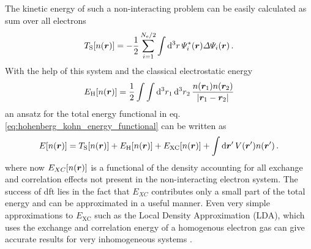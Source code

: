 \documentclass[main.tex]{subfiles}
\begin{document}
The kinetic energy of such a non-interacting problem can be easily calculated as sum over all electrons
\begin{equation}
    T_{\mathrm{S}} [n(\vb*{r})] = - \frac{1}{2} \sum_{i=1}^{N_{\mathrm{e}} / 2} \int \dd[3]{r} \Psi_i^* (\vb*{r}) \Delta \Psi_i (\vb*{r})\,.
\end{equation}
With the help of this system and the classical electrostatic energy 
\begin{equation}
    E_{\mathrm{H}} [n(\vb*{r})] = \frac{1}{2} \int \int \dd[3]{r_1} \dd[3]{r_2} \frac{n(\vb*{r}_1) n(\vb*{r}_2)}{\vert \vb*{r}_1 - \vb*{r}_2 \vert}
\end{equation}
an ansatz for the total energy functional in eq. \ref{eq:hohenberg_kohn_energy_functional} can be written as
\begin{equation}
    E[n(\vb*{r})] = T_{\mathrm{S}} [n(\vb*{r})] + E_{\mathrm{H}} [n(\vb*{r})] + E_{\mathrm{XC}} [n(\vb*{r})] + \int \dd{\vb*{r}^{\prime}} V(\vb*{r}^{\prime}) n (\vb*{r}^{\prime})\,.
\end{equation}
where now \(E_{XC} [n(\vb*{r})]\) is a functional of the density accounting for all exchange and correlation effects not present in the non-interacting electron system.
The success of \acrshort{dft} lies in the fact that \(E_{XC}\) contributes only a small part of the total energy and can be approximated in a useful manner. 
Even very simple approximations to \(E_{\mathrm{XC}}\) such as the Local Density Approximation (LDA), which uses the exchange and correlation energy of a homogenous electron gas can give accurate results for very inhomogeneous systems \cite{harris_adiabatic-connection_1984}.
\end{document}

